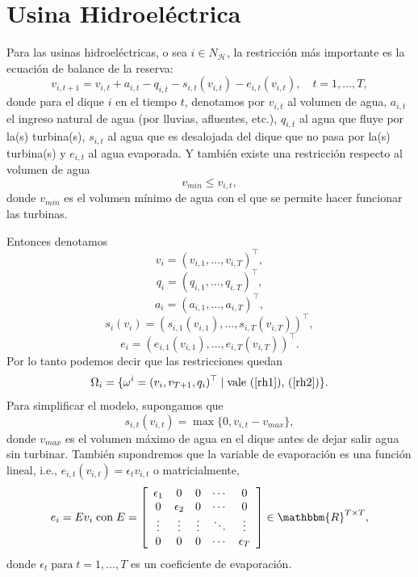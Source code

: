 \documentclass[a4paper,12pt]{report}
\newcommand{\RR}{\mathbbm{R}}
\newcommand{\om}{\omega}
\newcommand{\cH}{\mathcal{H}}
\begin{document}
\section{Usina Hidroel\'ectrica}\label{sec:hidro}

Para las usinas hidroel\'ectricas, o sea $i\in N_\cH$, la restricci\'on m\'as importante es la ecuaci\'on de balance de la reserva:
\begin{equation}\label{rh1}
v_{i,t+1}=v_{i,t}+a_{i,t}-q_{i,t}-s_{i,t}(v_{i,t})-e_{i,t}(v_{i,t}),\quad t=1,\ldots,T,
\end{equation}
donde para el dique $i$ en el tiempo $t$, denotamos por $v_{i,t}$ al volumen de agua, $a_{i,t}$ el ingreso natural de agua (por lluvias, afluentes, etc.), $q_{i,t}$ al agua que fluye por la(s) turbina(s), $s_{i,t}$ al agua que es desalojada del dique que no pasa por la(s) turbina(s) y $e_{i,t}$ al agua evaporada. Y tambi\'en existe una restricci\'on respecto al volumen de agua
\begin{equation}\label{rh2}
v_{min}\leq v_{i,t},
\end{equation}
donde $v_{min}$ es el volumen m\'inimo de agua con el que se permite hacer funcionar las turbinas.

Entonces denotamos $$v_i=(v_{i,1},\ldots,v_{i,T})^\top,$$ $$q_i=(q_{i,1},\ldots,q_{i,T})^\top,$$ $$a_i=(a_{i,1},\ldots,a_{i,T})^\top,$$ $$s_i(v_i)=(s_{i,1}(v_{i,1}),\ldots,s_{i,T}(v_{i,T}))^\top,$$ $$e_i=(e_{i,1}(v_{i,1}),\ldots,e_{i,T}(v_{i,T}))^\top.$$
Por lo tanto podemos decir que las restricciones quedan
$$\Omega_i=\{\om^i=(v_i,v_{T+1},q_i)^\top\mid \mbox{vale (\ref{rh1}), (\ref{rh2})}\}.$$
Para simplificar el modelo, supongamos que $$s_{i,t}(v_{i,t})=\max\{0,v_{i,t}-v_{max}\},$$
donde $v_{max}$ es el volumen m\'aximo de agua en el dique antes de dejar salir agua sin turbinar. Tambi\'en supondremos
que la variable de evaporaci\'on es una funci\'on lineal, i.e., $e_{i,t}(v_{i,t})=\epsilon_t v_{i,t}$ o matricialmente,
 $$e_i=E v_i\; \mbox{con}\; E=
\left[
\begin{array}{ccccc}
  \epsilon_1 & 0 & 0 & \cdots & 0 \\
  0   & \epsilon_2 & 0 & \cdots & 0\\ 
  \vdots & \vdots & \vdots & \ddots &  \vdots \\
  0 & 0 & 0 & \cdots & \epsilon_T
\end{array}\right]\in\RR^{T\times T},
$$
donde $\epsilon_t\;\mbox{para}\;t=1,\ldots,T$ es un coeficiente de evaporaci\'on.
\end{document}
